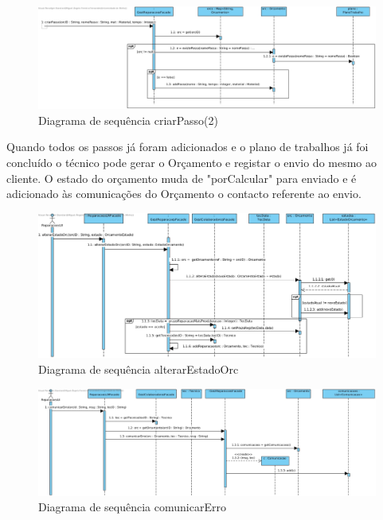 \documentclass[../relatorio.tex]{subfiles}
\begin{document}
\begin{figure}[!ht]
    \centering
    \includegraphics[scale=0.45]{../assets/diagramas_sequencia/sd-criarPasso2.jpg}
    \caption{Diagrama de sequência criarPasso(2)}
\end{figure}

Quando todos os passos já foram adicionados e o plano de trabalhos já foi concluído o técnico pode gerar o Orçamento e registar o 
envio do mesmo ao cliente. O estado do orçamento muda de "porCalcular" para enviado e é adicionado às comunicações do Orçamento o 
contacto referente ao envio.

\begin{figure}[!ht]
    \centering
    \includegraphics[scale=0.45]{../assets/diagramas_sequencia/sd-alterarEstadoOrc.jpg}
    \caption{Diagrama de sequência alterarEstadoOrc}
\end{figure}

\begin{figure}[!ht]
    \centering
    \includegraphics[scale=0.45]{../assets/diagramas_sequencia/sd-ComunicarErro.jpg}
    \caption{Diagrama de sequência comunicarErro}
\end{figure}
\end{document}
